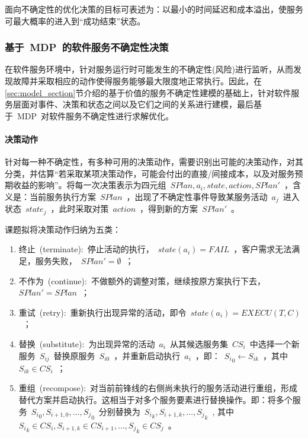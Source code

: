 面向不确定性的优化决策的目标可表述为：以最小的时间延迟和成本溢出，使服务可最大概率的进入到“成功结束”状态。

\subsubsection{基于~MDP~的软件服务不确定性决策}

在软件服务环境中，针对服务运行时可能发生的不确定性(风险)进行监听，从而发现故障并采取相应的动作使得服务能够最大限度地正常执行。因此，在\ref{sec:model_section}节介绍的基于价值的服务不确定性建模的基础上，针对软件服务层面对事件、决策和状态之间以及它们之间的关系进行建模，最后基于~MDP~对软件服务不确定性进行求解优化。

\setcounter{paragraph}{0}
\paragraph{决策动作}

针对每一种不确定性，有多种可用的决策动作，需要识别出可能的决策动作，对其分类，并估算“若采取某项决策动作，可能会付出的直接/间接成本，以及对服务预期收益的影响”。将每一次决策表示为四元组~$SPlan,{a_i},state,action,SPlan'$~，含义是：当前服务执行方案~$SPlan$~，出现了不确定性事件导致某服务活动~$a_j$~进入状态~$state_j$~，此时采取对策~$action$~，得到新的方案~$SPlan'$~。

课题拟将决策动作归纳为五类：
\begin{enumerate}
    \item 终止~(terminate):~停止活动的执行，~$state(a_i)=FAIL$~，客户需求无法满足，服务失败，~$SPlan'=\emptyset $~；
    \item 不作为~(continue):~不做额外的调整对策，继续按原方案执行下去，~$SPlan'=SPlan$~；
    \item 重试~(retry):~重新执行出现异常的活动，即令~$state(a_i)=EXECU(T, C)$~；
    \item 替换~(substitute):~为出现异常的活动~$a_i$~从其候选服务集~$CS_i$~中选择一个新服务~$S_{ij}$~替换原服务~$S_{i0}$~，并重新启动执行~$a_i$~，即：~${S_i}_0 \leftarrow {S_{ik}}$~，其中~${S_{ik}} \in C{S_i}$~；
    \item 重组~(recompose):~对当前前锋线的右侧尚未执行的服务活动进行重组，形成替代方案并启动执行。这相当于对多个服务要素进行替换操作。即：将多个服务~${S_i}_0,{S_{i + 1,0}}, \ldots ,{S_j}_0$~分别替换为~${S_i}_k,{S_{i + 1,k}}, \ldots ,{S_j}_k$~, 其中~${S_i}_k \in C{S_i},{S_{i + 1,k}} \in C{S_{i + 1}}, \ldots ,{S_j}_k \in C{S_j}$~。
\end{enumerate}

